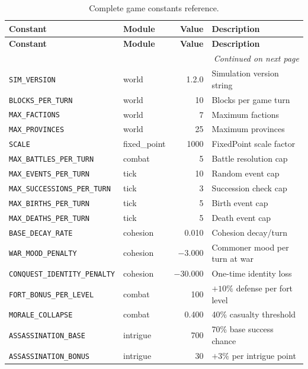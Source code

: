 \documentclass[a4paper, 11pt]{article}
\newcommand{\simversion}{1.2.0}
\begin{document}
\begin{longtable}{@{}llrl@{}}
\caption{Complete game constants reference.} \label{tab:constants} \\
\toprule
\textbf{Constant} & \textbf{Module} & \textbf{Value} & \textbf{Description} \\
\midrule
\endfirsthead
\toprule
\textbf{Constant} & \textbf{Module} & \textbf{Value} & \textbf{Description} \\
\midrule
\endhead
\midrule
\multicolumn{4}{r}{\textit{Continued on next page}} \\
\endfoot
\bottomrule
\endlastfoot
\texttt{SIM\_VERSION}             & world    & \simversion & Simulation version string \\
\texttt{BLOCKS\_PER\_TURN}        & world    & 10    & Blocks per game turn \\
\texttt{MAX\_FACTIONS}            & world    & 7     & Maximum factions \\
\texttt{MAX\_PROVINCES}           & world    & 25    & Maximum provinces \\
\texttt{SCALE}                    & fixed\_point & 1000 & FixedPoint scale factor \\
\texttt{MAX\_BATTLES\_PER\_TURN}  & combat   & 5     & Battle resolution cap \\
\texttt{MAX\_EVENTS\_PER\_TURN}   & tick     & 10    & Random event cap \\
\texttt{MAX\_SUCCESSIONS\_PER\_TURN} & tick  & 3     & Succession check cap \\
\texttt{MAX\_BIRTHS\_PER\_TURN}   & tick     & 5     & Birth event cap \\
\texttt{MAX\_DEATHS\_PER\_TURN}   & tick     & 5     & Death event cap \\
\texttt{BASE\_DECAY\_RATE}        & cohesion & 0.010 & Cohesion decay/turn \\
\texttt{WAR\_MOOD\_PENALTY}       & cohesion & $-3.000$ & Commoner mood per turn at war \\
\texttt{CONQUEST\_IDENTITY\_PENALTY} & cohesion & $-30.000$ & One-time identity loss \\
\texttt{FORT\_BONUS\_PER\_LEVEL}  & combat   & 100   & $+10\%$ defense per fort level \\
\texttt{MORALE\_COLLAPSE}         & combat   & 0.400 & 40\% casualty threshold \\
\texttt{ASSASSINATION\_BASE}      & intrigue & 700   & 70\% base success chance \\
\texttt{ASSASSINATION\_BONUS}     & intrigue & 30    & $+3\%$ per intrigue point \\

\end{longtable}
\end{document}
